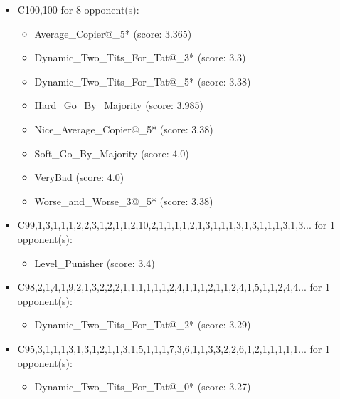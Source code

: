 \begin{appendices}
\begin{itemize}
    \item C100,100 for 8 opponent(s):
    \begin{multicols}{3}
         \begin{itemize}
            \item Average\_Copier@\_5* (score: 3.365)
            \item Dynamic\_Two\_Tits\_For\_Tat@\_3* (score: 3.3)
            \item Dynamic\_Two\_Tits\_For\_Tat@\_5* (score: 3.38)
            \item Hard\_Go\_By\_Majority (score: 3.985)
            \item Nice\_Average\_Copier@\_5* (score: 3.38)
            \item Soft\_Go\_By\_Majority (score: 4.0)
            \item VeryBad (score: 4.0)
            \item Worse\_and\_Worse\_3@\_5* (score: 3.38)
        \end{itemize}
     \end{multicols}
     
    \item C99,1,3,1,1,1,2,2,3,1,2,1,1,2,10,2,1,1,1,1,2,1,3,1,1,1,3,1,3,1,1,1,3,1,3... for 1 opponent(s):
    \begin{multicols}{3}
         \begin{itemize}
            \item Level\_Punisher (score: 3.4)
        \end{itemize}
     \end{multicols}
     
    \item C98,2,1,4,1,9,2,1,3,2,2,2,1,1,1,1,1,1,2,4,1,1,1,2,1,1,2,4,1,5,1,1,2,4,4... for 1 opponent(s):
    \begin{multicols}{3}
         \begin{itemize}
            \item Dynamic\_Two\_Tits\_For\_Tat@\_2* (score: 3.29)
        \end{itemize}
     \end{multicols}
     
    \item C95,3,1,1,1,3,1,3,1,2,1,1,3,1,5,1,1,1,7,3,6,1,1,3,3,2,2,6,1,2,1,1,1,1,1... for 1 opponent(s):
    \begin{multicols}{3}
         \begin{itemize}
            \item Dynamic\_Two\_Tits\_For\_Tat@\_0* (score: 3.27)
        \end{itemize}
     \end{multicols}
     

\end{itemize}
\end{appendices}
